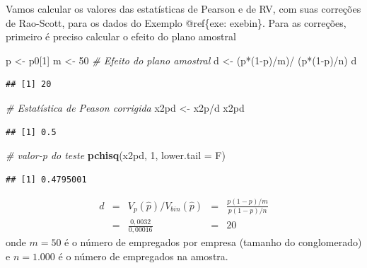\documentclass[]{book}
\newenvironment{Shaded}{\begin{snugshade}}{\end{snugshade}}
\newcommand{\KeywordTok}[1]{\textcolor[rgb]{0.13,0.29,0.53}{\textbf{{#1}}}}
\newcommand{\DataTypeTok}[1]{\textcolor[rgb]{0.13,0.29,0.53}{{#1}}}
\newcommand{\DecValTok}[1]{\textcolor[rgb]{0.00,0.00,0.81}{{#1}}}
\newcommand{\StringTok}[1]{\textcolor[rgb]{0.31,0.60,0.02}{{#1}}}
\newcommand{\CommentTok}[1]{\textcolor[rgb]{0.56,0.35,0.01}{\textit{{#1}}}}
\newcommand{\NormalTok}[1]{{#1}}
\numberwithin{example}{chapter}
\numberwithin{remark}{chapter}
\numberwithin{definition}{chapter}
\begin{document}
Vamos calcular os valores das estatísticas de Pearson e de RV, com suas
correções de Rao-Scott, para os dados do Exemplo @ref\{exe: exebin\}.
Para as correções, primeiro é preciso calcular o efeito do plano
amostral

\begin{Shaded}
\begin{Highlighting}[]
\NormalTok{p <-}\StringTok{ }\NormalTok{p0[}\DecValTok{1}\NormalTok{]}
\NormalTok{m <-}\StringTok{ }\DecValTok{50}
\CommentTok{# Efeito do plano amostral}
\NormalTok{d <-}\StringTok{ }\NormalTok{(p*(}\DecValTok{1}\NormalTok{-p)/m)/}\StringTok{ }\NormalTok{(p*(}\DecValTok{1}\NormalTok{-p)/n)}
\NormalTok{d}
\end{Highlighting}
\end{Shaded}

\begin{verbatim}
## [1] 20
\end{verbatim}

\begin{Shaded}
\begin{Highlighting}[]
\CommentTok{# Estatística de Peason corrigida}
\NormalTok{x2pd <-}\StringTok{ }\NormalTok{x2p/d}
\NormalTok{x2pd}
\end{Highlighting}
\end{Shaded}

\begin{verbatim}
## [1] 0.5
\end{verbatim}

\begin{Shaded}
\begin{Highlighting}[]
\CommentTok{# valor-p do teste}
\KeywordTok{pchisq}\NormalTok{(x2pd, }\DecValTok{1}\NormalTok{, }\DataTypeTok{lower.tail =} \NormalTok{F)}
\end{Highlighting}
\end{Shaded}

\begin{verbatim}
## [1] 0.4795001
\end{verbatim}

\[
\begin{array}{llcll}
d & = & V_{p}\left( \widehat{p}\right) /V_{bin}\left( \widehat{p}\right) & =
& \frac{p\left( 1-p\right) /m}{p\left( 1-p\right) /n} \\ 
& = & \frac{0,0032}{0,00016} & = & 20
\end{array}
\] onde \(m=50\) é o número de empregados por empresa (tamanho do
conglomerado) e \(n=1.000\) é o número de empregados na amostra.
\end{document}
